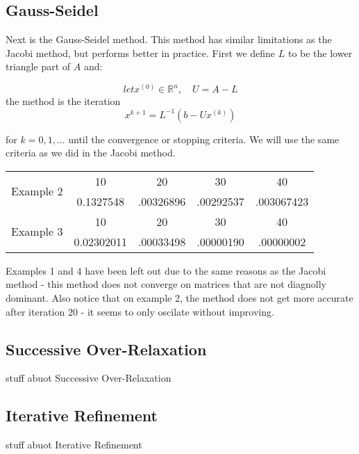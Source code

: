 \documentclass[11pt]{article}	%
\begin{document}
\subsection{Gauss-Seidel}
Next is the Gauss-Seidel method. This method has similar limitations as the Jacobi method, but performs better in practice.
First we define $L$ to be the lower triangle part of $A$ and:

\begin{equation}\label{eq:jacobi-eq-1}
    let x^{(0)}\in {\mathbb R}^n, \quad U = A - L
\end{equation}
the method is the iteration
\begin{equation}\label{eq:jacobi-eq-1}
    x^{k+1} = L^{-1}(b - Ux^{(k)})
\end{equation}

for $k = 0, 1, ...$ until the convergence or stopping criteria. We will use the same criteria as we did in the Jacobi method.

\begin{center}
    \begin{tabular}{||c|c|c|c|c||}
        \hline
        \multirow{2}{5em}{Example 2} & 10 & 20 & 30 & 40 \\ [.25em]
        & 0.1327548 & .00326896 & .00292537 & .003067423 \\ [.25em]
        \hline \hline
        \multirow{2}{5em}{Example 3} & 10 & 20 & 30 & 40 \\ [.25em]
        & 0.02302011 & .00033498 & .00000190 & .00000002 \\ [.25em]
        \hline
    \end{tabular}
\end{center}
Examples 1 and 4 have been left out due to the same reasons as the Jacobi method - this method does not converge on matrices that are not diagnolly dominant. Also notice that on example 2, the method does not get more accurate after iteration 20 - it seems to only oscilate without improving.

\subsection{Successive Over-Relaxation}
stuff abuot Successive Over-Relaxation

\subsection{Iterative Refinement}
stuff abuot Iterative Refinement
\end{document}

